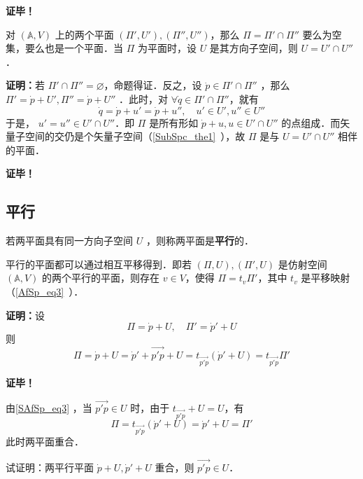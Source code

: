 \textbf{证毕！}
\begin{corollary}{}
对 $(\mathbb A,V)$ 上的两个平面 $(\Pi',U'),(\Pi'',U'')$，那么 $\Pi=\Pi'\cap\Pi''$ 要么为空集，要么也是一个平面．当 $\Pi$ 为平面时，设 $U$ 是其方向子空间，则 $U=U'\cap U''$．
\end{corollary}
\textbf{证明：}若 $\Pi'\cap\Pi''=\varnothing$，命题得证．反之，设 $\dot p\in \Pi'\cap\Pi''$ ，那么 $\Pi'=\dot p+U',\Pi''=\dot p+U''$ ．此时，对 $\forall\dot q\in\Pi'\cap\Pi''$，就有 \begin{equation}
\dot q=\dot p+u'=\dot p+u'',\quad u'\in U',u''\in U''
\end{equation}
于是， $u'=u''\in U'\cap U''$．即 $\Pi$ 是所有形如 $\dot p+u,u\in U'\cap U''$ 的点组成．而矢量子空间的交仍是个矢量子空间（\autoref{SubSpc_the1}~），故 $\Pi$ 是与 $U=U'\cap U''$ 相伴的平面．

\textbf{证毕！}
\subsection{平行}

\begin{definition}{}
若两平面具有同一方向子空间 $U$ ，则称两平面是\textbf{平行}的．
\end{definition}
\begin{theorem}{}
平行的平面都可以通过相互平移得到．即若 $(\Pi,U),(\Pi',U)$ 是仿射空间 $(\mathbb A,V)$ 的两个平行的平面，则存在 $v\in V$，使得 $\Pi=t_{v}\Pi'$，其中 $t_v$ 是平移映射（\autoref{AfSp_eq3}~）．
\end{theorem}
\textbf{证明：}设
\begin{equation}
\Pi=\dot p+U,\quad \Pi'=\dot p'+U
\end{equation}
则
\begin{equation}\label{SAfSp_eq3}
\Pi=\dot p+U=\dot p'+\overrightarrow{p'p}+U=t_{\overrightarrow{p'p}}(\dot p'+U)=t_{\overrightarrow{p'p}} \Pi'
\end{equation}

\textbf{证毕！}

由\autoref{SAfSp_eq3} ，当 $\overrightarrow{p'p}\in U$ 时，由于 $t_{\overrightarrow{p'p}}+U=U$，有
\begin{equation}
\Pi=t_{\overrightarrow{p'p}}(\dot p'+U)=\dot p'+U=\Pi'
\end{equation}
此时两平面重合．
\begin{exercise}{}
试证明：两平行平面 $\dot p+U,\dot p'+U$ 重合，则 $\overrightarrow{p'p}\in U$．
\end{exercise}